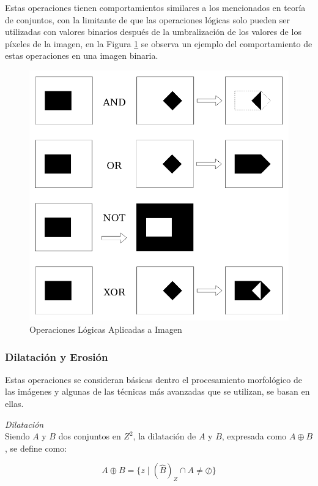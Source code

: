 Estas operaciones tienen comportamientos similares a los mencionados en teoría de conjuntos, con la limitante de que las operaciones lógicas solo pueden ser utilizadas con valores binarios después de la umbralización de los valores de los píxeles de la imagen, en la Figura \ref{fig:LogicOpIMG} se observa un ejemplo del comportamiento de estas operaciones en una imagen binaria.
\begin{figure}[H]
\centering
\includegraphics[scale=0.3]{Figures/LogicOp_IMG.png}
    \caption{Operaciones Lógicas Aplicadas a Imagen}
    \label{fig:LogicOpIMG}
\end{figure}

\subsubsection{Dilatación y Erosión}

Estas operaciones se consideran básicas dentro el procesamiento morfológico de las imágenes y algunas  de las técnicas más avanzadas que se utilizan, se basan en ellas.

\emph{Dilatación}\\
Siendo $A$ y $B$ dos conjuntos en $Z^2$, la dilatación de $A$ y $B$, expresada como $A \oplus B$, se define como:

\begin{equation*}
A \oplus B = \{ z \mid (\hat{B})_{Z} \cap A \neq \oslash \}
\end{equation*}

